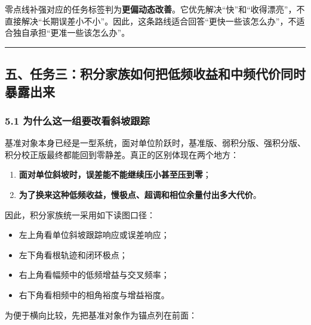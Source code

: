 \documentclass[
  11pt]{article}
\providecommand{\tightlist}{%
  \setlength{\itemsep}{0pt}\setlength{\parskip}{0pt}}
\begin{document}
零点线补强对应的任务标签判为\textbf{更偏动态改善}。它优先解决``快''和``收得漂亮''，不直接解决``长期误差小不小''。因此，这条路线适合回答``更快一些该怎么办''，不适合独自承担``更准一些该怎么办''。

\begin{center}\rule{0.5\linewidth}{0.5pt}\end{center}

\subsection{五、任务三：积分家族如何把低频收益和中频代价同时暴露出来}\label{ux4e94ux4efbux52a1ux4e09ux79efux5206ux5bb6ux65cfux5982ux4f55ux628aux4f4eux9891ux6536ux76caux548cux4e2dux9891ux4ee3ux4ef7ux540cux65f6ux66b4ux9732ux51faux6765}

\subsubsection{5.1
为什么这一组要改看斜坡跟踪}\label{ux4e3aux4ec0ux4e48ux8fd9ux4e00ux7ec4ux8981ux6539ux770bux659cux5761ux8ddfux8e2a}

基准对象本身已经是一型系统，面对单位阶跃时，基准版、弱积分版、强积分版、积分校正版最终都能回到零静差。真正的区别体现在两个地方：

\begin{enumerate}
\def\labelenumi{\arabic{enumi}.}
\tightlist
\item
  \textbf{面对单位斜坡时，误差能不能继续压小甚至压到零}；
\item
  \textbf{为了换来这种低频收益，慢极点、超调和相位余量付出多大代价}。
\end{enumerate}

因此，积分家族统一采用如下读图口径：

\begin{itemize}
\tightlist
\item
  左上角看单位斜坡跟踪响应或误差响应；
\item
  左下角看根轨迹和闭环极点；
\item
  右上角看幅频中的低频增益与交叉频率；
\item
  右下角看相频中的相角裕度与增益裕度。
\end{itemize}

为便于横向比较，先把基准对象作为锚点列在前面：
\end{document}
